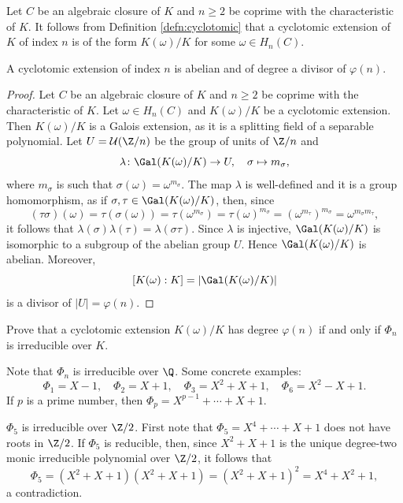 Let $C$ be an algebraic closure of $K$ and $n\geq2$ be coprime with the characteristic of $K$. 
It follows from Definition \ref{defn:cyclotomic} 
that a cyclotomic extension of $K$ of index $n$ is of the form 
$K(\omega)/K$ for some $\omega\in H_n(C)$. 

\begin{proposition}
    A cyclotomic extension of index $n$ is abelian and of degree a divisor of $\varphi(n)$. 
\end{proposition}

\begin{proof}
    Let $C$ be an algebraic closure of $K$ and $n\geq2$ be coprime with the characteristic of $K$. 
    Let $\omega\in H_n(C)$ and $K(\omega)/K$ be a cyclotomic extension. Then $K(\omega)/K$
    is a Galois extension, as it is a splitting field of a separable polynomial. 
    Let $U=\mathcal{U}(\Z/n)$ be the group of units of $\Z/n$ and 
    \[
    \lambda\colon \Gal(K(\omega)/K)\to U,
    \quad
    \sigma\mapsto m_{\sigma},
    \]
    where $m_{\sigma}$ is such that $\sigma(\omega)=\omega^{m_{\sigma}}$. The map $\lambda$ is well-defined and
    it is a group homomorphism, as if $\sigma,\tau\in\Gal(K(\omega)/K)$, then, since 
    \[
        (\tau\sigma)(\omega)=\tau(\sigma(\omega))=\tau(\omega^{m_\sigma})=\tau(\omega)^{m_\sigma}=\left(\omega^{m_\tau}\right)^{m_\sigma}=\omega^{m_\sigma m_\tau},
    \]
    it follows that $\lambda(\sigma)\lambda(\tau)=\lambda(\sigma\tau)$. Since 
    $\lambda$ is injective, $\Gal(K(\omega)/K)$ is isomorphic to a subgroup 
    of the abelian group $U$. Hence $\Gal(K(\omega)/K)$ is abelian. Moreover, 
    \[
    [K(\omega):K]=|\Gal(K(\omega)/K)|
    \]
    is a divisor of $|U|=\varphi(n)$. 
\end{proof}

\begin{exercise}
    Prove that a cyclotomic extension $K(\omega)/K$ has degree $\varphi(n)$ if and only if 
    $\Phi_n$ is irreducible over $K$. 
\end{exercise}

Note that $\Phi_n$ is irreducible over $\Q$. Some concrete examples:
\[
\Phi_1=X-1,
\quad
\Phi_2=X+1,
\quad
\Phi_3=X^2+X+1,
\quad
\Phi_6=X^2-X+1.
\]
If $p$ is a prime number, then $\Phi_p=X^{p-1}+\cdots+X+1$. 

\begin{example}
    $\Phi_5$ is irreducible over $\Z/2$. First note that
    $\Phi_5=X^{4}+\cdots+X+1$ does not have roots in $\Z/2$. If 
    $\Phi_5$ is reducible, then, since
    $X^2+X+1$ is the unique degree-two 
    monic irreducible polynomial 
    over $\Z/2$, it follows that
    \[
    \Phi_5=(X^2+X+1)(X^2+X+1)=(X^2+X+1)^2=X^4+X^2+1,
    \]
    a contradiction.
\end{example}

